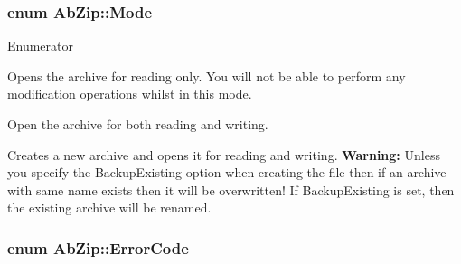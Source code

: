 \subsubsection[{\texorpdfstring{Mode}{Mode}}]{\setlength{\rightskip}{0pt plus 5cm}enum {\bf Ab\+Zip\+::\+Mode}}\hypertarget{class_ab_zip_ad24114feac0d38566f6b36f5fc0db54e}{}\label{class_ab_zip_ad24114feac0d38566f6b36f5fc0db54e}
\begin{Desc}
\item[Enumerator]\par
\begin{description}
\item[{\em 
mode\+Open\+Read\hypertarget{class_ab_zip_ad24114feac0d38566f6b36f5fc0db54eab1422ad58f4dcd50cff8ce563ec8a806}{}\label{class_ab_zip_ad24114feac0d38566f6b36f5fc0db54eab1422ad58f4dcd50cff8ce563ec8a806}
}]Opens the archive for reading only. You will not be able to perform any modification operations whilst in this mode. \item[{\em 
mode\+Open\+Write\hypertarget{class_ab_zip_ad24114feac0d38566f6b36f5fc0db54eacf5b3a4319c2d25e81ba95bef0ac3041}{}\label{class_ab_zip_ad24114feac0d38566f6b36f5fc0db54eacf5b3a4319c2d25e81ba95bef0ac3041}
}]Open the archive for both reading and writing. \item[{\em 
mode\+Create\+New\hypertarget{class_ab_zip_ad24114feac0d38566f6b36f5fc0db54ea9c1fc83e455d4baf3dacee9e691616b8}{}\label{class_ab_zip_ad24114feac0d38566f6b36f5fc0db54ea9c1fc83e455d4baf3dacee9e691616b8}
}]Creates a new archive and opens it for reading and writing. {\bfseries Warning\+:} Unless you specify the Backup\+Existing option when creating the file then if an archive with same name exists then it will be overwritten! If Backup\+Existing is set, then the existing archive will be renamed. \end{description}
\end{Desc}
\subsubsection[{\texorpdfstring{Error\+Code}{ErrorCode}}]{\setlength{\rightskip}{0pt plus 5cm}enum {\bf Ab\+Zip\+::\+Error\+Code}}\hypertarget{class_ab_zip_ac669c2fce0fbde75677d12711c11c504}{}\label{class_ab_zip_ac669c2fce0fbde75677d12711c11c504}


